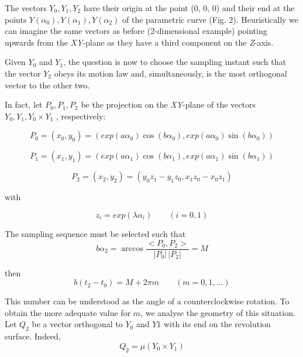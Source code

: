 \documentclass{article}
\begin{document}
The vectors $Y_0, Y_1, Y_2$ have their origin
at the point (0, 0, 0) and their end at the points $Y(\alpha_0), Y(\alpha_1),
Y(\alpha_2)$ of the parametric curve (Fig. 2). Heuristically we can
imagine the same vectors as before (2-dimensional example)
pointing upwards from the \textit{XY}-plane as they have a third component
on the \textit{Z}-axis.

Given $Y_0$ and $Y_1$, the question is now to choose the sampling
instant such that the vector $Y_2$ obeys its motion law and,
simultaneously, is the most orthogonal vector to the other two.

In fact, let $P_0, P_1, P_2$ be the projection on the \textit{XY}-plane of the
vectors $Y_0, Y_1, Y_0 \times Y_1$ , respectively:

\begin{equation}\label{eq:54}
P_0 = (x_0, y_0) = (exp(a\alpha_0)\cos (b\alpha_0), exp(a\alpha_0)\sin (b\alpha_0))
\end{equation}

\begin{equation}\label{eq:55}
P_1 = (x_1, y_1) = (exp(a\alpha_1)\cos (b\alpha_1), exp(a\alpha_1)\sin (b\alpha_1))
\end{equation}

\begin{equation}\label{eq:56}
P_2 = (x_2, y_2) = (y_0 z_1 - y_1 z_0, x_1 z_0 - x_0 z_1)
\end{equation}

with

\begin{equation}\label{eq:57}
z_i = exp(\lambda \alpha_i) \qquad (i=0, 1)
\end{equation}

The sampling sequence must be selected such that
\begin{equation}\label{eq:58}
b\alpha_2 = \arccos \frac{< P_0, P_2 >}{|P_0| \,|P_2|} = M
\end{equation}

then
\begin{equation}\label{eq:59}
b(t_2-t_0)= M + 2\pi m \qquad (m=0, 1, \ldots )
\end{equation}

This number can be understood as the angle of a
counterclockwise rotation. To obtain the more adequate value for
$m$, we analyse the geometry of this situation. Let $Q_2$ be a vector
orthogonal to $Y_0$ and $Y1$ with its end on the revolution surface.
Indeed,
\begin{equation}\label{eq:60}
Q_2 = \mu (Y_0 \times Y_1)
\end{equation}
\end{document}
